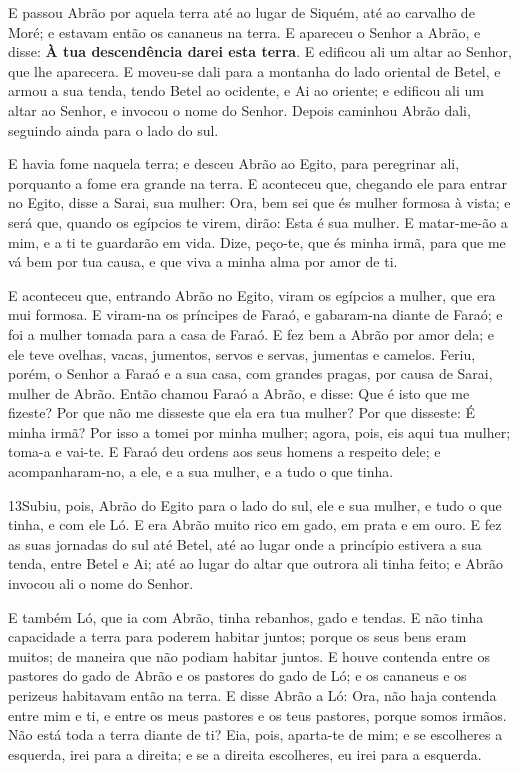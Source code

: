 E passou Abrão por aquela terra até ao lugar de Siquém, até ao
carvalho de Moré; e estavam então os cananeus na terra. E
apareceu o Senhor a Abrão, e disse: \textbf{À tua descendência darei
esta terra}. E edificou ali um altar ao Senhor, que lhe aparecera.
E moveu-se dali para a montanha do lado oriental de Betel, e
armou a sua tenda, tendo Betel ao ocidente, e Ai ao oriente; e
edificou ali um altar ao Senhor, e invocou o nome do Senhor.
Depois caminhou Abrão dali, seguindo ainda para o lado do sul.

E havia fome naquela terra; e desceu Abrão ao Egito, para
peregrinar ali, porquanto a fome era grande na terra. E
aconteceu que, chegando ele para entrar no Egito, disse a Sarai, sua
mulher: Ora, bem sei que és mulher formosa à vista; e será
que, quando os egípcios te virem, dirão: Esta é sua mulher. E
matar-me-ão a mim, e a ti te guardarão em vida. Dize,
peço-te, que és minha irmã, para que me vá bem por tua causa, e que
viva a minha alma por amor de ti.

E aconteceu que, entrando Abrão no Egito, viram os egípcios a
mulher, que era mui formosa. E viram-na os príncipes de
Faraó, e gabaram-na diante de Faraó; e foi a mulher tomada para a
casa de Faraó. E fez bem a Abrão por amor dela; e ele teve
ovelhas, vacas, jumentos, servos e servas, jumentas e camelos.
Feriu, porém, o Senhor a Faraó e a sua casa, com grandes
pragas, por causa de Sarai, mulher de Abrão. Então chamou
Faraó a Abrão, e disse: Que é isto que me fizeste? Por que não me
disseste que ela era tua mulher? Por que disseste: É minha
irmã? Por isso a tomei por minha mulher; agora, pois, eis aqui tua
mulher; toma-a e vai-te. E Faraó deu ordens aos seus homens a
respeito dele; e acompanharam-no, a ele, e a sua mulher, e a tudo o
que tinha.

\smallskip

\lettrine{13} Subiu, pois, Abrão do Egito para o lado do sul,
ele e sua mulher, e tudo o que tinha, e com ele Ló. E era Abrão
muito rico em gado, em prata e em ouro. E fez as suas jornadas
do sul até Betel, até ao lugar onde a princípio estivera a sua
tenda, entre Betel e Ai; até ao lugar do altar que outrora ali
tinha feito; e Abrão invocou ali o nome do Senhor.

E também Ló, que ia com Abrão, tinha rebanhos, gado e tendas.
E não tinha capacidade a terra para poderem habitar juntos;
porque os seus bens eram muitos; de maneira que não podiam habitar
juntos. E houve contenda entre os pastores do gado de Abrão e os
pastores do gado de Ló; e os cananeus e os perizeus habitavam então
na terra. E disse Abrão a Ló: Ora, não haja contenda entre mim e
ti, e entre os meus pastores e os teus pastores, porque somos
irmãos. Não está toda a terra diante de ti? Eia, pois, aparta-te
de mim; e se escolheres a esquerda, irei para a direita; e se a
direita escolheres, eu irei para a esquerda.

